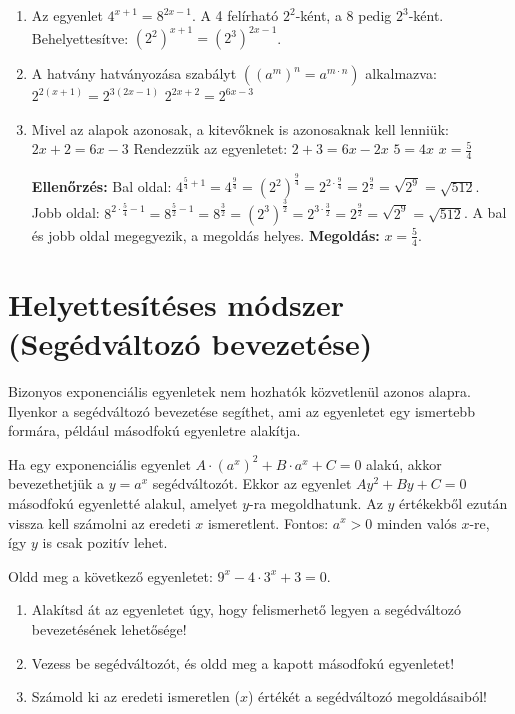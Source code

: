 \documentclass[a4paper,12pt]{article}
\theoremstyle{definition} %
\begin{document}
\begin{megoldasdoboz}
\begin{enumerate}[label=(\alph*)]
    \item Az egyenlet $4^{x+1} = 8^{2x-1}$.
    A 4 felírható $2^2$-ként, a 8 pedig $2^3$-ként.
    Behelyettesítve: $(2^2)^{x+1} = (2^3)^{2x-1}$.
    \item A hatvány hatványozása szabályt $( (a^m)^n = a^{m \cdot n} )$ alkalmazva:
    $2^{2(x+1)} = 2^{3(2x-1)}$
    $2^{2x+2} = 2^{6x-3}$
    \item Mivel az alapok azonosak, a kitevőknek is azonosaknak kell lenniük:
    $2x+2 = 6x-3$
    Rendezzük az egyenletet:
    $2+3 = 6x-2x$
    $5 = 4x$
    $x = \frac{5}{4}$

\textbf{Ellenőrzés:}
Bal oldal: $4^{\frac{5}{4}+1} = 4^{\frac{9}{4}} = (2^2)^{\frac{9}{4}} = 2^{2 \cdot \frac{9}{4}} = 2^{\frac{9}{2}} = \sqrt{2^9} = \sqrt{512}$.
Jobb oldal: $8^{2 \cdot \frac{5}{4}-1} = 8^{\frac{5}{2}-1} = 8^{\frac{3}{2}} = (2^3)^{\frac{3}{2}} = 2^{3 \cdot \frac{3}{2}} = 2^{\frac{9}{2}} = \sqrt{2^9} = \sqrt{512}$.
A bal és jobb oldal megegyezik, a megoldás helyes.
\textbf{Megoldás:} $x = \frac{5}{4}$.
\end{enumerate}
\end{megoldasdoboz}

\section*{Helyettesítéses módszer (Segédváltozó bevezetése)}

Bizonyos exponenciális egyenletek nem hozhatók közvetlenül azonos alapra. Ilyenkor a segédváltozó bevezetése segíthet, ami az egyenletet egy ismertebb formára, például másodfokú egyenletre alakítja.

\begin{teteldoboz}
Ha egy exponenciális egyenlet $A \cdot (a^x)^2 + B \cdot a^x + C = 0$ alakú, akkor bevezethetjük a $y = a^x$ segédváltozót. Ekkor az egyenlet $A y^2 + B y + C = 0$ másodfokú egyenletté alakul, amelyet $y$-ra megoldhatunk. Az $y$ értékekből ezután vissza kell számolni az eredeti $x$ ismeretlent. Fontos: $a^x > 0$ minden valós $x$-re, így $y$ is csak pozitív lehet.
\end{teteldoboz}

\begin{feladatdoboz}
Oldd meg a következő egyenletet: $9^x - 4 \cdot 3^x + 3 = 0$.
\begin{enumerate}[label=(\alph*)]
    \item Alakítsd át az egyenletet úgy, hogy felismerhető legyen a segédváltozó bevezetésének lehetősége!
    \item Vezess be segédváltozót, és oldd meg a kapott másodfokú egyenletet!
    \item Számold ki az eredeti ismeretlen ($x$) értékét a segédváltozó megoldásaiból!
\end{enumerate}
\end{feladatdoboz}
\end{document}
